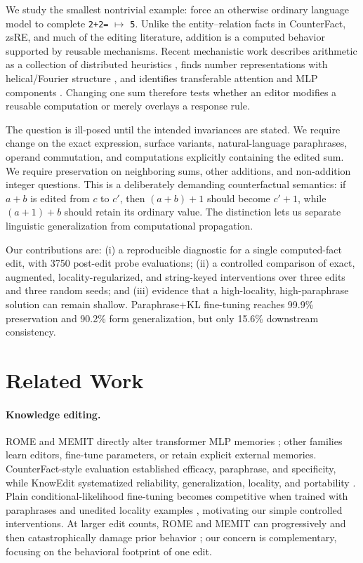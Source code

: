 \documentclass[10pt,twocolumn]{article}
\newcommand{\edit}{\texttt{2+2=} $\mapsto$ \texttt{5}}
\begin{document}
We study the smallest nontrivial example: force an otherwise ordinary language model to complete \edit.  Unlike the entity--relation facts in CounterFact, zsRE, and much of the editing literature, addition is a computed behavior supported by reusable mechanisms.  Recent mechanistic work describes arithmetic as a collection of distributed heuristics \citep{nikankin2024arithmetic}, finds number representations with helical/Fourier structure \citep{kantamneni2025trigonometry}, and identifies transferable attention and MLP components \citep{zhang2024arithmetic}.  Changing one sum therefore tests whether an editor modifies a reusable computation or merely overlays a response rule.

The question is ill-posed until the intended invariances are stated.  We require change on the exact expression, surface variants, natural-language paraphrases, operand commutation, and computations explicitly containing the edited sum.  We require preservation on neighboring sums, other additions, and non-addition integer questions.  This is a deliberately demanding counterfactual semantics: if $a+b$ is edited from $c$ to $c'$, then $(a+b)+1$ should become $c'+1$, while $(a+1)+b$ should retain its ordinary value.  The distinction lets us separate linguistic generalization from computational propagation.

Our contributions are: (i) a reproducible diagnostic for a single computed-fact edit, with 3750 post-edit probe evaluations; (ii) a controlled comparison of exact, augmented, locality-regularized, and string-keyed interventions over three edits and three random seeds; and (iii) evidence that a high-locality, high-paraphrase solution can remain shallow.  Paraphrase+KL fine-tuning reaches 99.9\% preservation and 90.2\% form generalization, but only 15.6\% downstream consistency.

\section{Related Work}
\paragraph{Knowledge editing.}
ROME and MEMIT directly alter transformer MLP memories \citep{meng2022rome,meng2023memit}; other families learn editors, fine-tune parameters, or retain explicit external memories.  CounterFact-style evaluation established efficacy, paraphrase, and specificity, while KnowEdit systematized reliability, generalization, locality, and portability \citep{zhang2024knowedit}.  Plain conditional-likelihood fine-tuning becomes competitive when trained with paraphrases and unedited locality examples \citep{gangadhar2024finetuning}, motivating our simple controlled interventions.  At larger edit counts, ROME and MEMIT can progressively and then catastrophically damage prior behavior \citep{gupta2024scale}; our concern is complementary, focusing on the behavioral footprint of one edit.
\end{document}
